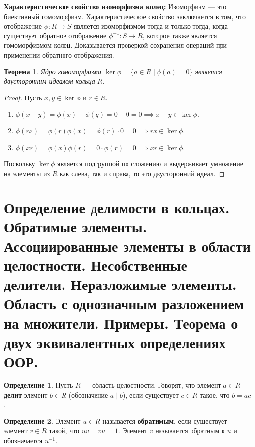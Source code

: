 \documentclass[12pt, a4paper]{article}
\theoremstyle{definition}
\newtheorem{definition}{Определение}[section]
\theoremstyle{plain}
\newtheorem{theorem}{Теорема}[section]
\begin{document}
	\textbf{Характеристическое свойство изоморфизма колец:}
	Изоморфизм — это биективный гомоморфизм. Характеристическое свойство заключается в том, что отображение $\phi: R \to S$ является изоморфизмом тогда и только тогда, когда существует обратное отображение $\phi^{-1}: S \to R$, которое также является гомоморфизмом колец. Доказывается проверкой сохранения операций при применении обратного отображения.
	
	\begin{theorem}
		Ядро гомоморфизма $\ker \phi = \{a \in R \mid \phi(a) = 0\}$ является двусторонним идеалом кольца $R$.
	\end{theorem}
	\begin{proof}
		Пусть $x, y \in \ker \phi$ и $r \in R$.
		\begin{enumerate}
			\item $\phi(x-y) = \phi(x) - \phi(y) = 0 - 0 = 0 \implies x-y \in \ker \phi$.
			\item $\phi(rx) = \phi(r)\phi(x) = \phi(r) \cdot 0 = 0 \implies rx \in \ker \phi$.
			\item $\phi(xr) = \phi(x)\phi(r) = 0 \cdot \phi(r) = 0 \implies xr \in \ker \phi$.
		\end{enumerate}
		Поскольку $\ker \phi$ является подгруппой по сложению и выдерживает умножение на элементы из $R$ как слева, так и справа, то это двусторонний идеал.
	\end{proof}
	
	\newpage
	\setcounter{section}{3}
	\section{Определение делимости в кольцах. Обратимые элементы. Ассоциированные элементы в области целостности. Несобственные делители. Неразложимые элементы. Область с однозначным разложением на множители. Примеры. Теорема о двух эквивалентных определениях ООР.}
	
	\begin{definition}
		Пусть $R$ — область целостности. Говорят, что элемент $a \in R$ \textbf{делит} элемент $b \in R$ (обозначение $a \mid b$), если существует $c \in R$ такое, что $b=ac$.
	\end{definition}
	
	\begin{definition}
		Элемент $u \in R$ называется \textbf{обратимым}, если существует элемент $v \in R$ такой, что $uv=vu=1$. Элемент $v$ называется обратным к $u$ и обозначается $u^{-1}$.
	\end{definition}
	
\end{document}
